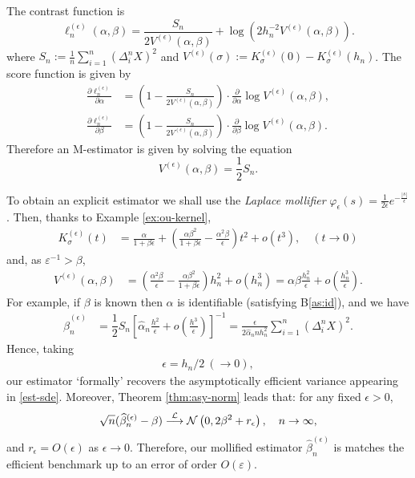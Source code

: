 \documentclass[a4paper,10pt,twoside]{article}
\numberwithin{equation}{section}
\def\ve{{\varepsilon}}
\def\e{{\epsilon}}
\def\D{\Delta}
\def\l{\left}
\def\r{\right}
\def\a{\alpha}
\def\b{\beta}
\def\s{\sigma}
\def\toD{\stackrel{{\cal L}}{\longrightarrow}}
\def\wh#1{\widehat{#1}}
\begin{document}
The contrast function is
\[
\ell_n^{(\e)}(\alpha, \beta) = \frac{S_n}{2 V^{(\e)}(\alpha, \beta)} + \log\l(2 h_n^{-2} V^{(\e)}(\alpha, \beta)\r).
\]
where $S_n := \frac{1}{n} \sum_{i=1}^n (\Delta_i^n X)^2$ and $V^{(\e)}(\sigma) := K_\sigma^{(\e)}(0) - K_\sigma^{(\e)}(h_n)$. 
The score function is given by 
\begin{align*}
\frac{\partial \ell_n^{(\e)}}{\partial \alpha} &= \l( 1 -\frac{S_n}{2 V^{(\e)}(\a,\b)} \r)\cdot \frac{\partial}{\partial \a}\log V^{(\e)}(\a,\b), \\
\frac{\partial \ell_n^{(\e)}}{\partial \beta} &=\l( 1 - \frac{S_n}{2 V^{(\e)}(\a,\b)} \r) \cdot \frac{\partial}{\partial \beta}\log V^{(\e)}(\a,\b).
\end{align*}
Therefore an M-estimator is given by solving the equation 
\[
V^{(\e)}(\a,\b) = \frac{1}{2}S_n.
\]

To obtain an explicit estimator we shall use the {\it Laplace mollifier} $\varphi_\e(s) = \frac{1}{2\e} e^{-\frac{|s|}{\e}}$. 
Then, thanks to Example \ref{ex:ou-kernel}, 
\begin{align*}
K_\s^{(\e)}(t) &=\frac{\a}{1 + \b\e} + \l(\frac{\a\b^2}{1+\b\e} - \frac{\a^2\b}{\e}\r) t^2 + o(t^3), \quad (t\to 0) 
\end{align*}
and, as $\ve^{-1} > \b$, 
\begin{align*}
V^{(\e)}(\a,\b) &= \l( \frac{\alpha^2 \beta}{\e} - \frac{\alpha \beta^2}{1 + \beta \e} \r) h_n^2 + o(h_n^3) = \a\b \frac{h_n^2}{\e} + o\l(\frac{h_n^3}{\e}\r). 
\end{align*}
For example, if $\b$ is known then $\a$ is identifiable (satisfying B\ref{as:id}), and we have 
\begin{align*}
\widehat{\b}_n^{(\e)} &= \dfrac{1}{2} S_n\l[ \wh{\a}_n \frac{h^2}{\e} + o\l(\frac{h^3}{\e}\r) \r]^{-1} = \frac{\e}{2\wh{\a}_n nh_n^2} \sum_{i=1}^n (\D_i^n X)^2. %
\end{align*}
Hence, taking 
\begin{align*}
\e = h_n/2\ (\to 0), %
\end{align*}
our estimator `formally' recovers the asymptotically efficient variance appearing in \eqref{est-sde}. 
Moreover, Theorem \ref{thm:asy-norm} leads that: for any fixed $\e>0$, 
\begin{align*}
\sqrt{n}(\widehat{\b}_n^{(\e)} - \b) \toD \mathcal{N}\l(0, 2\b^{2} + r_\e\r),\quad n\to \infty,  
\end{align*}
and $r_\e = O(\e)$ as $\e\to 0$. Therefore, our mollified estimator $\widehat{\b}_n^{(\e)}$ is matches the efficient benchmark up to an error of order $O(\varepsilon)$. 
\end{document}
